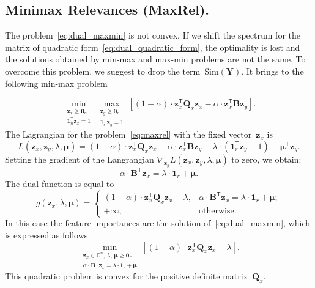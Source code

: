 \documentclass[12pt,twoside]{article}
\theoremstyle{definition}
\newcommand{\bz}{\mathbf{z}}
\newcommand{\bY}{\mathbf{Y}}
\newcommand{\bB}{\mathbf{B}}
\newcommand{\bQ}{\mathbf{Q}}
\newcommand{\T}{\mathsf{T}}
\newcommand{\bmu}{\boldsymbol{\mu}}
\newcommand{\bOne}{\boldsymbol{1}}
\newcommand{\bZero}{\boldsymbol{0}}
\begin{document}
\subsection{Minimax Relevances (MaxRel).}

The problem~\eqref{eq:dual_maxmin} is not convex. If we shift the spectrum for the matrix of quadratic form~\eqref{eq:dual_quadratic_form}, the optimality is lost and the solutions obtained by min-max and max-min problems are not the same. To overcome this problem, we suggest to drop the term~$\text{Sim}(\bY)$. It brings to the following min-max problem

\begin{equation}
\min_{\substack{\bz_x \geq \bZero_n \\ \bOne_n^{\T}\bz_x=1}} 	\max_{\substack{\bz_y \geq \bZero_r \\ \bOne_r^{\T}\bz_y=1}} \left[ (1 - \alpha) \cdot \bz_x^{\T} \bQ_x \bz_x - \alpha \cdot \bz_x^{\T} \bB \bz_y \right].
\label{eq:maxrel}
\end{equation}
The Lagrangian for the problem~\eqref{eq:maxrel} with the fixed vector~$\bz_x$ is
\begin{equation*}
L(\bz_x, \bz_y, \lambda, \bmu) = (1 - \alpha) \cdot \bz_x^{\T} \bQ_x \bz_x - \alpha \cdot \bz_x^{\T} \bB \bz_y + \lambda \cdot  (\bOne_r^{\T} \bz_y - 1) + \bmu^{\T} \bz_y.
\end{equation*}
Setting the gradient of the Langrangian $\nabla_{\bz_y} L(\bz_x, \bz_y, \lambda, \bmu)$ to zero, we obtain:
\begin{equation*}
\alpha \cdot \bB^{\T} \bz_x = \lambda \cdot \bOne_r + \bmu.
\end{equation*}
The dual function is equal to
\begin{equation*}
g(\bz_x, \lambda, \bmu) =
\begin{cases}
(1 - \alpha) \cdot \bz_x^{\T} \bQ_x \bz_x - \lambda, & \alpha \cdot \bB^{\T} \bz_x = \lambda \cdot \bOne_r + \bmu;  \\
+ \infty, & \text{otherwise}.
\end{cases}
\end{equation*}
In this case the feature importances are the solution of~\eqref{eq:dual_maxmin}, which is expressed as follows
\begin{equation*}
\min_{\substack{\bz_x \in \mathbb{C}^n, \, \lambda, \, \bmu \geq \bZero_r \\ \alpha \cdot \bB^{\T} \bz_x = \lambda \cdot \bOne_r + \bmu}} \left[ (1 - \alpha) \cdot \bz_x^{\T} \bQ_x \bz_x - \lambda \right].
\end{equation*}
This quadratic problem is convex for the positive definite matrix~$\bQ_x$.
\end{document}

